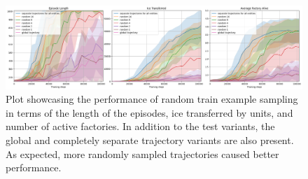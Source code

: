 \begin{figure}[htbp]
    \centering
    \includegraphics[width= 0.95\linewidth]{images/results_hybrid/trajectory_sample_reduction_random/combined.png}
    \captionsetup{justification=justified, singlelinecheck=false, width=1\linewidth, labelfont=bf} 
    \caption[]{Plot showcasing the performance of random train example sampling in terms of the length of the episodes, ice transferred by units, and number of active factories. In addition to the test variants, the global and completely separate trajectory variants are also present. As expected, more randomly sampled trajectories caused better performance.}
    \label{fig:hybrid_results/trajectory_sample_reduction_random/combined}
\end{figure}


